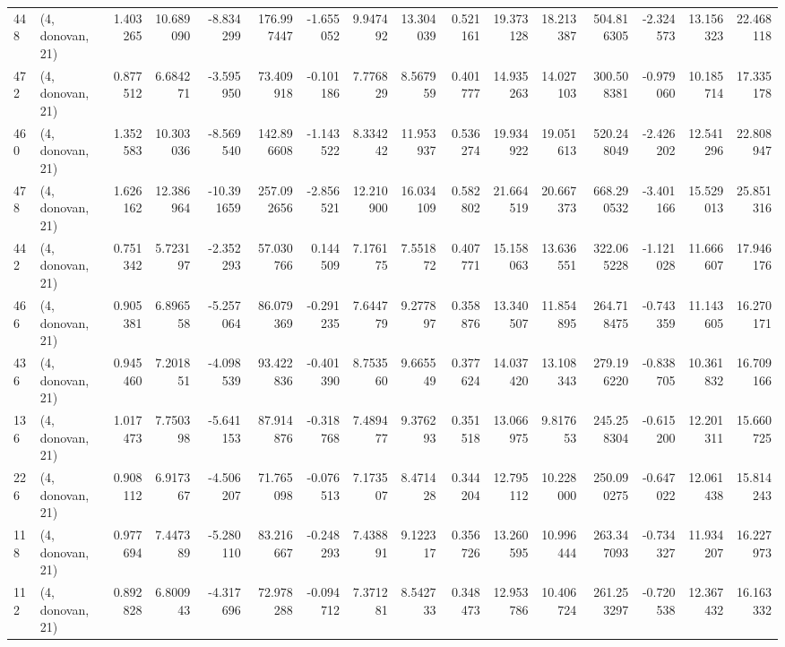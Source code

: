 \begin{tabular}{llrrrrrrrrrrrrrr}
448 &  (4, donovan, 21) &   1.403265 &  10.689090 &  -8.834299 &   176.997447 &  -1.655052 &   9.947492 &  13.304039 &  0.521161 &  19.373128 &  18.213387 &   504.816305 & -2.324573 &  13.156323 &  22.468118 \\
472 &  (4, donovan, 21) &   0.877512 &   6.684271 &  -3.595950 &    73.409918 &  -0.101186 &   7.776829 &   8.567959 &  0.401777 &  14.935263 &  14.027103 &   300.508381 & -0.979060 &  10.185714 &  17.335178 \\
460 &  (4, donovan, 21) &   1.352583 &  10.303036 &  -8.569540 &   142.896608 &  -1.143522 &   8.334242 &  11.953937 &  0.536274 &  19.934922 &  19.051613 &   520.248049 & -2.426202 &  12.541296 &  22.808947 \\
478 &  (4, donovan, 21) &   1.626162 &  12.386964 & -10.391659 &   257.092656 &  -2.856521 &  12.210900 &  16.034109 &  0.582802 &  21.664519 &  20.667373 &   668.290532 & -3.401166 &  15.529013 &  25.851316 \\
442 &  (4, donovan, 21) &   0.751342 &   5.723197 &  -2.352293 &    57.030766 &   0.144509 &   7.176175 &   7.551872 &  0.407771 &  15.158063 &  13.636551 &   322.065228 & -1.121028 &  11.666607 &  17.946176 \\
466 &  (4, donovan, 21) &   0.905381 &   6.896558 &  -5.257064 &    86.079369 &  -0.291235 &   7.644779 &   9.277897 &  0.358876 &  13.340507 &  11.854895 &   264.718475 & -0.743359 &  11.143605 &  16.270171 \\
436 &  (4, donovan, 21) &   0.945460 &   7.201851 &  -4.098539 &    93.422836 &  -0.401390 &   8.753560 &   9.665549 &  0.377624 &  14.037420 &  13.108343 &   279.196220 & -0.838705 &  10.361832 &  16.709166 \\
136 &  (4, donovan, 21) &   1.017473 &   7.750398 &  -5.641153 &    87.914876 &  -0.318768 &   7.489477 &   9.376293 &  0.351518 &  13.066975 &   9.817653 &   245.258304 & -0.615200 &  12.201311 &  15.660725 \\
226 &  (4, donovan, 21) &   0.908112 &   6.917367 &  -4.506207 &    71.765098 &  -0.076513 &   7.173507 &   8.471428 &  0.344204 &  12.795112 &  10.228000 &   250.090275 & -0.647022 &  12.061438 &  15.814243 \\
118 &  (4, donovan, 21) &   0.977694 &   7.447389 &  -5.280110 &    83.216667 &  -0.248293 &   7.438891 &   9.122317 &  0.356726 &  13.260595 &  10.996444 &   263.347093 & -0.734327 &  11.934207 &  16.227973 \\
112 &  (4, donovan, 21) &   0.892828 &   6.800943 &  -4.317696 &    72.978288 &  -0.094712 &   7.371281 &   8.542733 &  0.348473 &  12.953786 &  10.406724 &   261.253297 & -0.720538 &  12.367432 &  16.163332 \\

\end{tabular}
